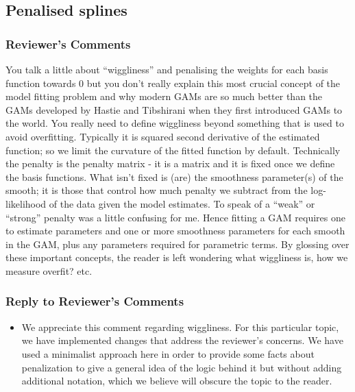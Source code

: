 \documentclass[
]{article}
\providecommand{\tightlist}{%
  \setlength{\itemsep}{0pt}\setlength{\parskip}{0pt}}
\begin{document}
\hypertarget{penalised-splines}{%
\subsection{Penalised splines}\label{penalised-splines}}

\hypertarget{reviewers-comments-5}{%
\subsubsection{Reviewer's Comments}\label{reviewers-comments-5}}

You talk a little about ``wiggliness'' and penalising the weights for each basis function towards 0 but you don't really explain this most crucial concept of the model fitting problem and why modern GAMs are so much better than the GAMs developed by Hastie and Tibshirani when they first introduced GAMs to the world.
You really need to define wiggliness beyond something that is used to avoid overfitting. Typically it is squared second derivative of the estimated function; so we limit the curvature of the fitted function by default. Technically the penalty is the penalty matrix - it is a matrix and it is fixed once we define the basis functions. What isn't fixed is (are) the smoothness parameter(s) of the smooth; it is those that control how much penalty we subtract from the log-likelihood of the data given the model estimates. To speak of a ``weak'' or ``strong'' penalty was a little confusing for me.
Hence fitting a GAM requires one to estimate parameters and one or more smoothness parameters for each smooth in the GAM, plus any parameters required for parametric terms.
By glossing over these important concepts, the reader is left wondering what wiggliness is, how we measure overfit? etc.

\hypertarget{section-6}{%
\subsubsection{\texorpdfstring{\textcolor{reviewersblue} {Reply to Reviewer's Comments}}{}}\label{section-6}}

\begin{itemize}
\tightlist
\item
  We appreciate this comment regarding wiggliness. For this particular topic, we have implemented changes that address the reviewer's concerns. We have used a minimalist approach here in order to provide some facts about penalization to give a general idea of the logic behind it but without adding additional notation, which we believe will obscure the topic to the reader.
\end{itemize}
\end{document}
